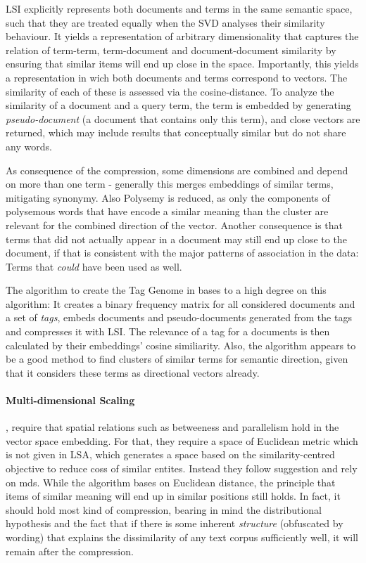 LSI explicitly represents both documents and terms in the same semantic space, such that they are treated equally when the SVD analyses their similarity behaviour. It yields a representation of arbitrary dimensionality that captures the relation of term-term, term-document and document-document similarity by ensuring that similar items will end up close in the space. Importantly, this yields a representation in wich both documents and terms correspond to vectors. The similarity of each of these is assessed via the cosine-distance. To analyze the similarity of a document and a query term, the term is embedded by generating \textit{pseudo-document} (a document that contains only this term), and close vectors are returned, which may include results that conceptually similar but do not share any words. 

As consequence of the compression, some dimensions are combined and depend on more than one term - generally this merges embeddings of similar terms, mitigating synonymy. Also Polysemy is reduced, as only the components of polysemous words that have encode a similar meaning than the cluster are relevant for the combined direction of the vector. Another consequence is that terms that did not actually appear in a document may still end up close to the document, if that is consistent with the major patterns of association in the data: Terms that \textit{could} have been used as well.

The algorithm to create the Tag Genome in \cite{VISR12} bases to a high degree on this algorithm: It creates a binary frequency matrix for all considered documents and a set of \textit{tags}, embeds documents and pseudo-documents generated from the tags and compresses it with LSI. The relevance of a tag for a documents  is then calculated by their embeddings' cosine similiarity. Also, the algorithm appears to be a good method to find clusters of similar terms for semantic direction, given that it considers these terms as directional vectors already. 

\paragraph*{Multi-dimensional Scaling}
\label{sec:mds}

\textcite{Derrac2015}, require that spatial relations such as betweeness and parallelism hold in the vector space embedding. For that, they require a space of Euclidean metric which is not given in LSA, which generates a space based on the similarity-centred objective to reduce \glspl{cos} of similar entites. Instead they follow \textcite{Gardenfors2000a} suggestion and rely on \gls{mds}. While the algorithm bases on Euclidean distance, the principle that items of similar meaning will end up in similar positions still holds. In fact, it should hold most kind of compression, bearing in mind the distributional hypothesis and the fact that if there is some inherent \textit{structure} (obfuscated by wording) that explains the dissimilarity of any text corpus sufficiently well, it will remain after the compression.


